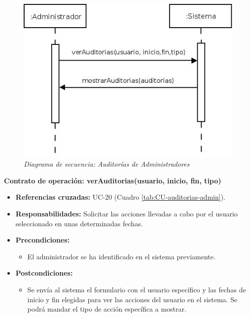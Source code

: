 \begin{figure}[H]
\centering
  \includegraphics[scale=.55]{img/secuencias/auditorias-administrador.jpeg}
  \caption{\textit{Diagrama de secuencia: Auditorías de Administradores}}
  \label{fig:secuencia-auditorias-administrador}
\end{figure}

\textbf{Contrato de operación: verAuditorias(usuario, inicio, fin, tipo)}
\begin{itemize}
\item \textbf{Referencias cruzadas:} UC-20 (Cuadro \ref{tab:CU-auditorias-admin}).
\item \textbf{Responsabilidades:} Solicitar las acciones llevadas a cabo por el usuario seleccionado en unas determinadas fechas.
\item \textbf{Precondiciones:} 
 \begin{itemize}
\item El administrador se ha identificado en el sistema previamente.
\end {itemize}
\item \textbf{Postcondiciones:} 
 \begin{itemize}
\item Se envía al sistema el formulario con el usuario específico y las fechas de inicio y fin elegidas para ver las acciones del usuario en el sistema. Se podrá mandar el tipo de acción específica a mostrar.
\end {itemize}
\end {itemize}

